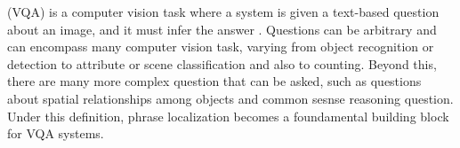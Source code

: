  (VQA) is a computer vision task
where a system is given a text-based question about an image, and it
must infer the answer . Questions can be
arbitrary and can encompass many computer vision task, varying from
object recognition or detection to attribute or scene classification
and also to counting. Beyond this, there are many more complex
question that can be asked, such as questions about spatial
relationships among objects and common sesnse reasoning question. 
Under this definition, phrase localization becomes a foundamental
building block for VQA systems.

